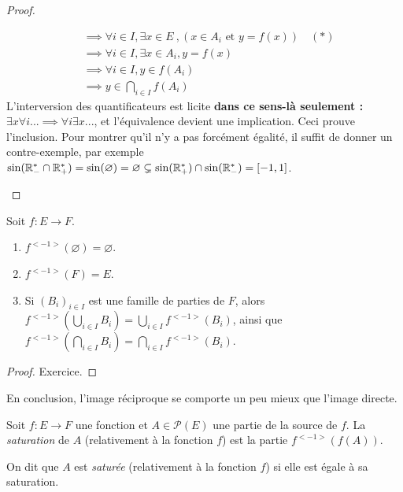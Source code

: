 \begin{proof}
\begin{enumerate}
\begin{align*}
&\boxed{\implies \forall i\in I, \exists x\in E}\:, (x\in A_i\text{ et } y=f(x)) \quad(*)\\
&\implies \forall i\in I, \exists x\in A_i, y=f(x)\\
&\implies \forall i\in I, y\in f(A_i)\\
&\implies y\in \bigcap_{i\in I} f(A_i)
\end{align*}
L'interversion des quantificateurs  est licite \textbf{dans ce sens-là seulement : $\exists x \forall i ... \implies \forall i \exists x ...$}, et l'équivalence devient une implication. Ceci prouve l'inclusion. Pour montrer qu'il n'y a pas forcément égalité, il suffit de donner un contre-exemple, par exemple $\sin(\mathbb{R}_-^* \cap \mathbb{R}_+^*) = \sin(\varnothing) = \varnothing \subsetneq \sin(\mathbb{R}_+^*) \cap \sin(\mathbb{R}_-^*)=[-1,1]$.
\end{enumerate}
\end{proof}

\begin{proposition}
Soit $f : E\to F$.
\begin{enumerate}
\item $f^{<-1>}(\varnothing)=\varnothing$.
\item $f^{<-1>}(F)=E$.
\item Si $(B_i)_{i\in I}$ est une famille de parties de $F$, alors $f^{<-1>}\left(\bigcup_{i\in I}B_i\right) = \bigcup_{i\in I} f^{<-1>}(B_i)$, ainsi que $f^{<-1>}\left(\bigcap_{i\in I}B_i\right) = \bigcap_{i\in I} f^{<-1>}(B_i)$.
\end{enumerate}
\end{proposition}
\begin{proof} Exercice.
\end{proof}

En conclusion, l'image réciproque se comporte un peu mieux que l'image directe.

\begin{definition}
Soit $f : E\to F$ une fonction et $A\in \mathcal P(E)$ une partie de la source de $f$. La \emph{saturation} de $A$ (relativement à la fonction $f$) est la partie $f^{<-1>}(f(A))$.

On dit que $A$ est \emph{saturée} (relativement à la fonction $f$) si elle est égale à sa saturation.
\end{definition}

